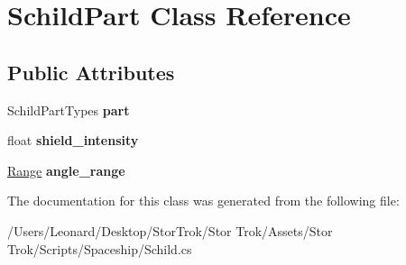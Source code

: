 \hypertarget{class_schild_part}{}\section{Schild\+Part Class Reference}
\label{class_schild_part}
\subsection*{Public Attributes}
\begin{DoxyCompactItemize}
\item 
\mbox{\label{class_schild_part_a900286b8b48e1e2a224f9b92ebe40ab4}} 
Schild\+Part\+Types {\bfseries part}
\item 
\mbox{\label{class_schild_part_a4bd11fb17812f14e5a0b1b19c740c5bb}} 
float {\bfseries shield\+\_\+intensity}
\item 
\mbox{\label{class_schild_part_a6986bc6860d63b4d0fc3b05c74c83709}} 
\hyperlink{class_range}{Range} {\bfseries angle\+\_\+range}
\end{DoxyCompactItemize}


The documentation for this class was generated from the following file\+:\begin{DoxyCompactItemize}
\item 
/\+Users/\+Leonard/\+Desktop/\+Stor\+Trok/\+Stor Trok/\+Assets/\+Stor Trok/\+Scripts/\+Spaceship/Schild.\+cs\end{DoxyCompactItemize}
